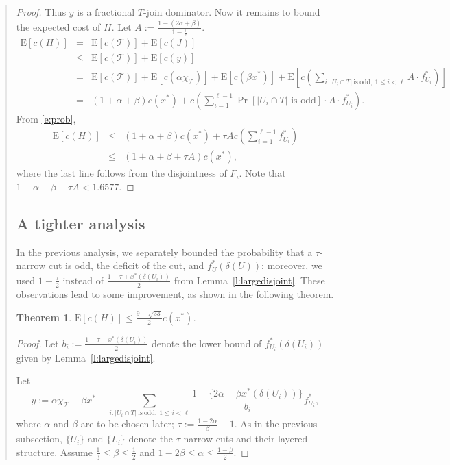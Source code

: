 \documentclass[11pt,letterpaper]{article}
\newtheorem{thm}{Theorem}
\newcommand{\E}{\mathrm{E}}
\begin{document}
\begin{quote}
\begin{proof}
Thus $y$ is a fractional $T$-join dominator. Now it remains to bound the expected cost of $H$. Let $\displaystyle A:=\frac{1-(2\alpha+\beta)}{1-\frac{\tau}{2}}$. \begin{eqnarray*}
\E[c(H)] &=& \E[c(\mathscr{T})] + \E[c(J)]\\
&\leq& \E[c(\mathscr{T})] + \E[c(y)]\\
&=& \E[c(\mathscr{T})] + \E[c(\alpha\chi_{\mathscr{T}})] + \E[c(\beta x^*)] +
\E\left[c\left(\sum_{i:|U_i \cap T|\mathrm{~is~odd,~}1\leq i<\ell} A\cdot f^*_{U_i}\right)\right]\\
&=& (1+\alpha+\beta)c(x^*)+ c\left(\sum_{i=1}^{\ell-1} \Pr[|U_i \cap T|\textrm{ is odd}] \cdot A\cdot f^*_{U_i}\right)
.\end{eqnarray*}From \eqref{e:prob},\begin{eqnarray*}
\E[c(H)] &\leq& (1+\alpha+\beta)c(x^*)+ \tau A c\left(\sum_{i=1}^{\ell-1} f^*_{U_i}\right)\\
&\leq& \left(1+\alpha+\beta+ \tau A \right )c(x^*)
,\end{eqnarray*}where the last line follows from the disjointness of $F_i$. Note that $1+\alpha+\beta+ \tau A <1.6577$.
\end{proof}

\subsection{A tighter analysis}

In the previous analysis, we separately bounded the probability that a $\tau$-narrow cut is odd, the deficit of the cut, and $f^*_U(\delta(U))$; moreover, we used $1-\frac{\tau}{2}$ instead of $\frac{1-\tau+x^*(\delta(U_i))}{2}$ from Lemma~\ref{l:largedisjoint}. These observations lead to some improvement, as shown in the following theorem.

\begin{thm}\label{t:iint}
$\E[c(H)]\leq\frac{9-\sqrt{33}}{2} c(x^*)$.
\end{thm}
\begin{proof}
Let $\displaystyle b_i:=\frac{1-\tau+x^*(\delta(U_i))}{2}$ denote the lower bound of $f^*_{U_i}(\delta(U_i))$ given by Lemma~\ref{l:largedisjoint}.

Let\[
y:= \alpha\chi_{\mathscr{T}}+\beta x^*+\sum_{i:|U_i \cap T|\mathrm{~is~odd,~}1\leq i<\ell} \frac{1-\{2\alpha+\beta x^*(\delta(U_i))\}}{b_i}f^*_{U_i}
,\]where $\alpha$ and $\beta$ are to be chosen later; $\tau:=\frac{1-2\alpha}{\beta}-1$. As in the previous subsection, $\{U_i\}$ and $\{L_i\}$ denote the $\tau$-narrow cuts and their layered structure. Assume $\frac{1}{3}\leq \beta\leq\frac{1}{2}$ and $1-2\beta\leq\alpha\leq\frac{1-\beta}{2}$.


\end{proof}
\end{quote}
\end{document}
